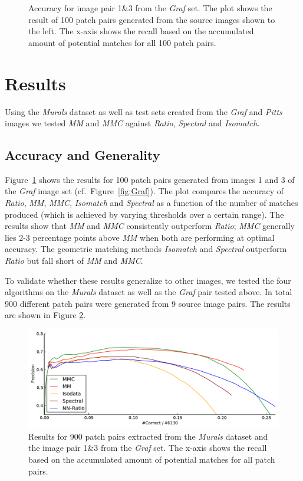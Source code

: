 \begin{figure}[t]
\begin{subfigure}[c]{0.8\textwidth}
	\end{subfigure}%
	\caption{Accuracy for image pair 1\&3 from the \emph{Graf} set. The 
	plot shows the result of 100 patch pairs generated from the source 
	images shown to the left. The x-axis shows the recall based on the 
accumulated amount of potential matches for all 100 patch pairs. }
	\label{fig:result_graf}
\end{figure}

\section{Results}
\label{S:Results}

Using the \emph{Murals} dataset as well as test sets created from the 
\emph{Graf} and \emph{Pitts} images we tested \emph{MM} and \emph{MMC} 
against \emph{Ratio}, \emph{Spectral} and \emph{Isomatch}.

\subsection{Accuracy and Generality}

Figure~\ref{fig:result_graf} shows the results for 100 patch pairs 
generated from images 1 and 3 of the \emph{Graf} image set 
(cf.~Figure~\ref{fig:Graf}). The plot compares the accuracy of 
\emph{Ratio}, \emph{MM}, \emph{MMC}, \emph{Isomatch} and \emph{Spectral} 
as a function of the number of matches produced (which is achieved by 
varying thresholds over a certain range). The results show that 
\emph{MM} and \emph{MMC} consistently outperform \emph{Ratio}; 
\emph{MMC} generally lies 2-3 percentage points above \emph{MM} when 
both are performing at optimal accuracy.  The geometric matching methods 
\emph{Isomatch} and \emph{Spectral} outperform \emph{Ratio} but fall 
short of \emph{MM} and \emph{MMC}.


To validate whether these results generalize to other images, we tested 
the four algorithms on the \emph{Murals} dataset as well as the 
\emph{Graf} pair tested above.  In total 900 different patch pairs were 
generated from 9 source image pairs.  The results are shown in Figure 
\ref{fig:result_accumulated}. 

\begin{figure}[htb]
	\centering
	\includegraphics[width=\columnwidth]{images/result_accumulated}
	\caption{Results for 900 patch pairs extracted from the 
	\emph{Murals} dataset and the image pair 1\&3 from the \emph{Graf} 
	set.  The x-axis shows the recall based on the accumulated amount of 
potential matches for all patch pairs.}
	\label{fig:result_accumulated}
\end{figure}

